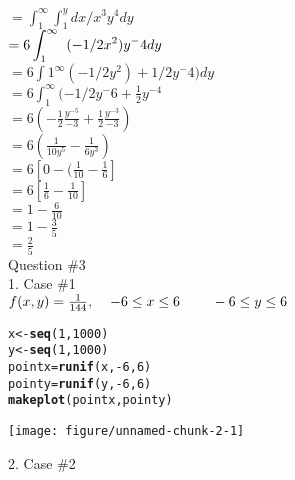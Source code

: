 \documentclass[11]{article}\usepackage[]{graphicx}\usepackage[]{color}
\makeatletter
\def\maxwidth{ %
  \ifdim\Gin@nat@width>\linewidth
    \linewidth
  \else
    \Gin@nat@width
  \fi
}
\newcommand{\hlnum}[1]{\textcolor[rgb]{0.686,0.059,0.569}{#1}}%
\newcommand{\hlopt}[1]{\textcolor[rgb]{0,0,0}{#1}}%
\newcommand{\hlstd}[1]{\textcolor[rgb]{0.345,0.345,0.345}{#1}}%
\newcommand{\hlkwb}[1]{\textcolor[rgb]{0.69,0.353,0.396}{#1}}%
\newcommand{\hlkwd}[1]{\textcolor[rgb]{0.737,0.353,0.396}{\textbf{#1}}}%
\newenvironment{kframe}{%
 \def\at@end@of@kframe{}%
 \ifinner\ifhmode%
  \def\at@end@of@kframe{\end{minipage}}%
  \begin{minipage}{\columnwidth}%
 \fi\fi%
 \def\FrameCommand##1{\hskip\@totalleftmargin \hskip-\fboxsep
 \colorbox{shadecolor}{##1}\hskip-\fboxsep
     \hskip-\linewidth \hskip-\@totalleftmargin \hskip\columnwidth}%
 \MakeFramed {\advance\hsize-\width
   \@totalleftmargin\z@ \linewidth\hsize
   \@setminipage}}%
 {\par\unskip\endMakeFramed%
 \at@end@of@kframe}
\newenvironment{knitrout}{}{} %
\makeatother
\begin{document}
\begin{flushleft}
$\displaystyle{=\int_1^\infty \int_1^y dx/x^3}y^4dy$\\

$\displaystyle{= 6 \int_1^\infty \hspace{ 2 mm} (-1/2x^2) y^-4 dy}$\\	

\vspace{ 3 mm} 
$=6 \int1^\infty (-1/2y^2) + 1/2 y^-4) dy$\\
$=6 \int_1^\infty(-1/2 y^-6 + \frac{1}{2} y ^{-4} $\\

$=6(-\frac{1}{2} \frac{y^{-5}}{-3} + \frac{1}{2} \frac{y^{-3}}{-3})$\\
$=6(\frac{1}{10y^5} -\frac{1}{6y^3})$\\
$=6[0 - (\frac{1}{10} - \frac{1}{6}]$\\
$=6[\frac{1}{6} - \frac{1}{10}]$\\
$=1-\frac{6}{10}$\\
$=1 - \frac{3}{5}$\\
$=\frac{2}{5}$\\

Question \#3\\
1. Case \#1\\
$f(x,y) = \frac{1}{144}, \hspace{4 mm} 
-6\leq x \leq 6 \hspace{8 mm} -6 \leq y \leq 6$
\vspace{3 mm}\\

\begin{knitrout}
\color{fgcolor}\begin{kframe}
\begin{alltt}
\hlstd{x}\hlkwb{<-}\hlkwd{seq}\hlstd{(}\hlnum{1}\hlstd{,}\hlnum{1000}\hlstd{)}
\hlstd{y}\hlkwb{<-}\hlkwd{seq}\hlstd{(}\hlnum{1}\hlstd{,}\hlnum{1000}\hlstd{)}
\hlstd{pointx}\hlkwb{=}\hlkwd{runif}\hlstd{(x,}\hlopt{-}\hlnum{6}\hlstd{,}\hlnum{6}\hlstd{)}
\hlstd{pointy}\hlkwb{=}\hlkwd{runif}\hlstd{(y,}\hlopt{-}\hlnum{6}\hlstd{,}\hlnum{6}\hlstd{)}
\hlkwd{makeplot}\hlstd{(pointx,pointy)}
\end{alltt}
\end{kframe}
\texttt{[image: figure/unnamed-chunk-2-1]} 

\end{knitrout}


2. Case \#2\\


\end{flushleft}
\end{document}
